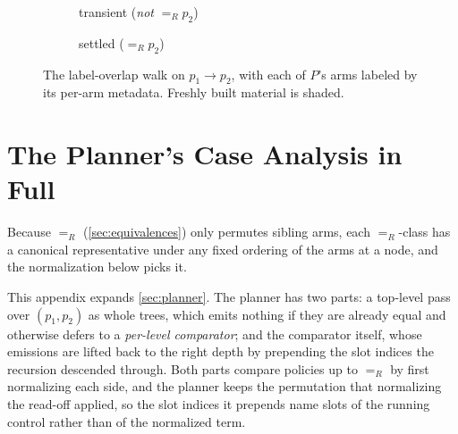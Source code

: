 \documentclass[sigplan,anonymous,review,nonacm]{acmart}
\newcommand{\eqR}{=_R}
\newcommand{\freshbehind}[1]{%
  \begin{pgfonlayer}{background}
    \node[fill=newcol!12, rounded corners=2pt, anchor=center, inner sep=3.5pt, fit=#1] {};
  \end{pgfonlayer}}
\begin{document}
\begin{figure}[t]
\begin{subfigure}[t]{0.33\linewidth}
    \caption{transient (\emph{not} \(\eqR p_2\))}
    \label{fig:label-overlap-transient}
  \end{subfigure}\hfill
  \begin{subfigure}[t]{0.23\linewidth}
    \centering
    \caption{settled (\(\eqR p_2\))}
    \label{fig:label-overlap-settled}
  \end{subfigure}

  \caption{The label-overlap walk on \(p_1 \to p_2\), with each of \(P\)'s arms labeled by its per-arm metadata. Freshly built material is shaded.}
  \label{fig:label-overlap-example}
\end{figure}

\section{The Planner's Case Analysis in Full}\label{app:planner-emits}

Because \(\eqR\) (\cref{sec:equivalences}) only permutes sibling arms, each \(\eqR\)-class has a canonical representative under any fixed ordering of the arms at a node, and the normalization below picks it.

This appendix expands \cref{sec:planner}.
The planner has two parts: a top-level pass over \((p_1, p_2)\) as whole trees, which emits nothing if they are already equal and otherwise defers to a \emph{per-level comparator}; and the comparator itself, whose emissions are lifted back to the right depth by prepending the slot indices the recursion descended through.
Both parts compare policies up to \(\eqR\) by first normalizing each side, and the planner keeps the permutation that normalizing the read-off applied, so the slot indices it prepends name slots of the running control rather than of the normalized term.
\end{document}
